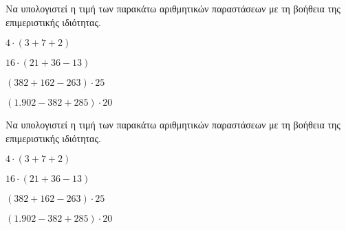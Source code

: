 Να υπολογιστεί η τιμή των παρακάτω αριθμητικών παραστάσεων με τη βοήθεια της επιμεριστικής ιδιότητας.
\begin{rlist}
\item $ 4\cdot(3+7+2) $
\item $ 16\cdot(21+36-13) $
\item $ (382+162-263)\cdot25 $
\item $ (1.902-382+285)\cdot20 $
\end{rlist}
Να υπολογιστεί η τιμή των παρακάτω αριθμητικών παραστάσεων με τη βοήθεια της επιμεριστικής ιδιότητας.
\begin{rlist}
\item $ 4\cdot(3+7+2) $
\item $ 16\cdot(21+36-13) $
\item $ (382+162-263)\cdot25 $
\item $ (1.902-382+285)\cdot20 $
\end{rlist}
